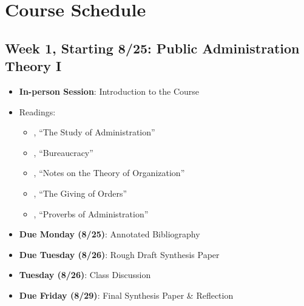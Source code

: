 \documentclass[12pt]{article}     %
\begin{document}

\section{Course Schedule}

\subsection*{Week 1, Starting 8/25: Public Administration Theory I}
\begin{itemize}
    \item \textbf{In-person Session}: Introduction to the Course
    \item Readings:
        \begin{itemize}
            \item \citet{WILSON1887a}, ``The Study of Administration''
            \item \citet{Weber1946}, ``Bureaucracy'' 
            \item \citet{gulick1937}, ``Notes on the Theory of Organization'' 
            \item \citet{Follett1926}, ``The Giving of Orders'' 
            \item \citet{simon1946}, ``Proverbs of Administration'' 
        \end{itemize}
    \item \textbf{Due Monday (8/25)}: Annotated Bibliography
    \item \textbf{Due Tuesday (8/26)}: Rough Draft Synthesis Paper
    \item \textbf{Tuesday (8/26)}: Class Discussion
    \item \textbf{Due Friday (8/29)}: Final Synthesis Paper \& Reflection
\end{itemize}
\end{document}
